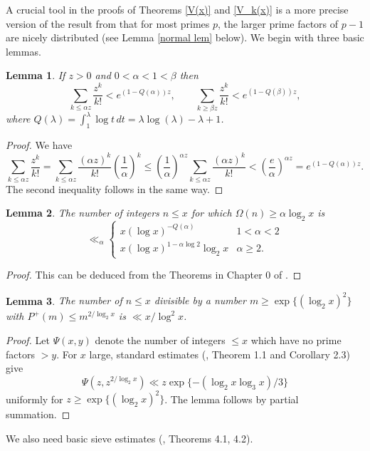 \documentclass[11pt]{amsart}
\theoremstyle{remark}
\theoremstyle{plain}
\newtheorem{lem}{Lemma}[section]
\numberwithin{equation}{section}
\renewcommand{\a}{\ensuremath{\alpha}}
\renewcommand{\b}{\ensuremath{\beta}}
\renewcommand{\(}{\left(}
\renewcommand{\)}{\right)}
\newcommand{\pfrac}[2]{\left(\frac{#1}{#2}\right)}
\renewcommand{\le}{\leqslant}
\renewcommand{\ge}{\geqslant}
\newcommand{\om}{\Omega}
\begin{document}
A crucial tool in the proofs of Theorems \ref{V(x)} and \ref{V_k(x)}
is a more precise version
of the result from \cite{MP} that for most primes $p$, the larger
prime factors of $p-1$ are nicely distributed (see Lemma \ref{normal lem}
below).  We begin with three basic lemmas.

\begin{lem} \label{exp partial} If $z>0$ and $0<\alpha<1<\b$ then
$$
\sum_{k\le \alpha z} \frac{z^k}{k!}
< e^{(1-Q(\alpha))z}, \qquad
\sum_{k\ge \b z} \frac{z^k}{k!}
< e^{(1-Q(\b))z},
$$
where $Q(\lambda) = \int_1^\lambda \log t\, dt =
\lambda \log(\lambda) - \lambda + 1$.
\end{lem}

\begin{proof} We have
$$
\sum_{k\le \alpha z} \frac{z^k}{k!} =
\sum_{k\le \alpha z} \frac{(\alpha z)^k}{k!} \pfrac{1}{\alpha}^k \le
\pfrac{1}{\alpha}^{\alpha z} \sum_{k \le \alpha z} \frac{(\alpha z)^k}{k!}
< \pfrac{e}{\alpha}^{\alpha z} = e^{(1-Q(\alpha))z}.
$$
The second inequality follows in the same way.
\end{proof}

\begin{lem} \label{Omega lem}
The number of
integers $n \le x$ for which $\om(n) \ge \a \log_2 x$ is
$$
\ll_\a \begin{cases} x (\log x)^{-Q(\a)} & 1<\a<2 \\
x (\log x)^{1-\a \log 2}\log_2 x & \a \ge 2. \end{cases}
$$
\end{lem}

\begin{proof}  This can be deduced from the Theorems in Chapter 0 of
\cite{HaT}. \end{proof}

\begin{lem} \label{large prime small} The number of $n \le x$ divisible
by a number $m \ge \exp\{(\log_2 x)^2\}$ with $P^+(m) \le
m^{2/\log_2 x}$ is $\ll x/\log^2 x$.
\end{lem}
\begin{proof}
Let $\Psi(x,y)$ denote the number of integers $\le x$ which have no prime
factors $> y$.  For $x$ large, standard estimates
(\cite{HiT}, Theorem 1.1 and Corollary 2.3) give
$$
\Psi(z,z^{2/\log_2 x}) \ll z \exp\{-(\log_2 x  \log_3 x)/3 \}
$$
uniformly for $z\ge \exp\{(\log_2 x)^2 \}$.
The lemma follows by partial summation.
\end{proof}

We also need basic sieve estimates (\cite{HRi}, Theorems 4.1, 4.2).
\end{document}
